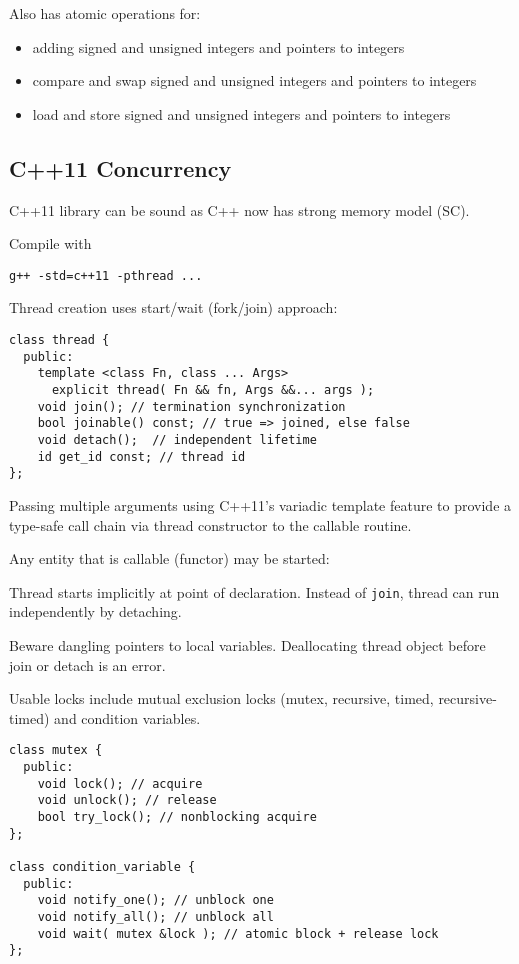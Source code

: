 \documentclass[11pt]{article}
\begin{document}
Also has atomic operations for:
\begin{itemize}
\item adding signed and unsigned integers and pointers to integers
\item compare and swap signed and unsigned integers and pointers to integers
\item load and store signed and unsigned integers and pointers to integers
\end{itemize}
\subsection{C++11 Concurrency}
\label{sec:orgc495a11}
C++11 library can be sound as C++ now has strong memory model (SC).

Compile with
\begin{verbatim}
g++ -std=c++11 -pthread ...
\end{verbatim}

Thread creation uses start/wait (fork/join) approach:
\begin{verbatim}
class thread {
  public:
    template <class Fn, class ... Args>
      explicit thread( Fn && fn, Args &&... args );
    void join(); // termination synchronization
    bool joinable() const; // true => joined, else false
    void detach();  // independent lifetime
    id get_id const; // thread id
};
\end{verbatim}

Passing multiple arguments using C++11's variadic template feature to provide
a type-safe call chain via thread constructor to the callable routine.

Any entity that is callable (functor) may be started:

Thread starts implicitly at point of declaration.
Instead of \texttt{join}, thread can run independently by detaching.

Beware dangling pointers to local variables.
Deallocating thread object before join or detach is an error.

Usable locks include mutual exclusion locks (mutex, recursive, timed,
recursive-timed) and condition variables.
\begin{verbatim}
class mutex {
  public:
    void lock(); // acquire
    void unlock(); // release
    bool try_lock(); // nonblocking acquire
};

class condition_variable {
  public:
    void notify_one(); // unblock one
    void notify_all(); // unblock all
    void wait( mutex &lock ); // atomic block + release lock
};
\end{verbatim}
\end{document}
